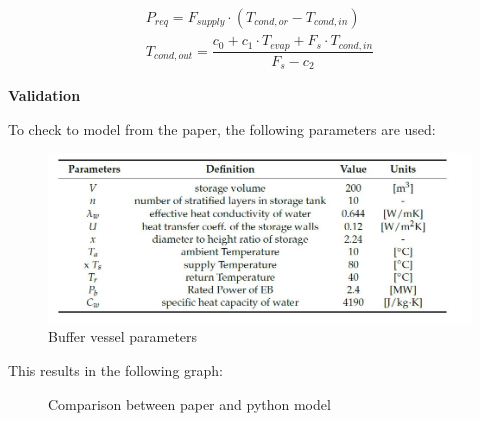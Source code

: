 \begin{equation}
	\begin{aligned}
		P_{req} = F_{supply} \cdot \left (T_{cond,or} - T_{cond,in} \right) \\
		T_{cond,out} = \dfrac{c_0 + c_1 \cdot T_{evap} + F_s \cdot T_{cond,in}}{F_s - c_2}
	\end{aligned}
\end{equation}

\textbf{Validation}

To check to model from the paper, the following parameters are used:

\begin{figure}[h]
	\centering
	\includegraphics[width=0.6\columnwidth]{Figures/parameters_paper.JPG}
	\caption[Short title]{Buffer vessel parameters}
\end{figure}

This results in the following graph:

\begin{figure}[H]
	\centering
	\qquad
	\caption{Comparison between paper and python model}
	\label{fig:Comparison}
\end{figure}

